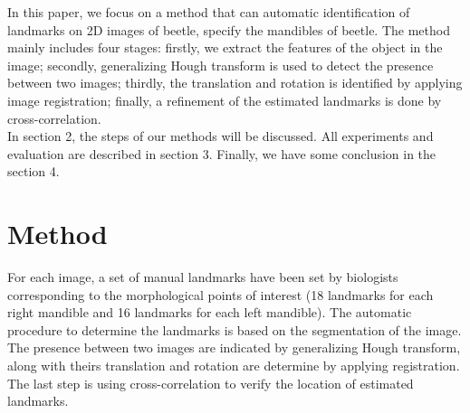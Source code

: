 \documentclass[twoside,twocolumn,10pt]{article}
\begin{document}
In this paper, we focus on a method that can automatic identification of landmarks on 2D images of beetle, specify the mandibles of beetle. The method mainly includes four stages: firstly, we extract the features of the object in the image; secondly, generalizing Hough transform is used to detect the presence between two images; thirdly, the translation and rotation is identified by applying image registration; finally, a refinement of the estimated landmarks is done by cross-correlation.\\[0.2cm]
In section 2, the steps of our methods will be discussed. All experiments and evaluation are described in section 3. Finally, we have some conclusion in the section 4.

\section{Method}
For each image, a set of manual landmarks have been set by biologists corresponding to the morphological points of interest (18 landmarks for each right mandible and 16 landmarks for each left mandible). The automatic procedure to determine the landmarks is based on the segmentation of the image. The presence between two images are indicated by generalizing Hough transform, along with theirs translation and rotation are determine by applying registration. The last step is using cross-correlation to verify the location of estimated landmarks.
\end{document}
